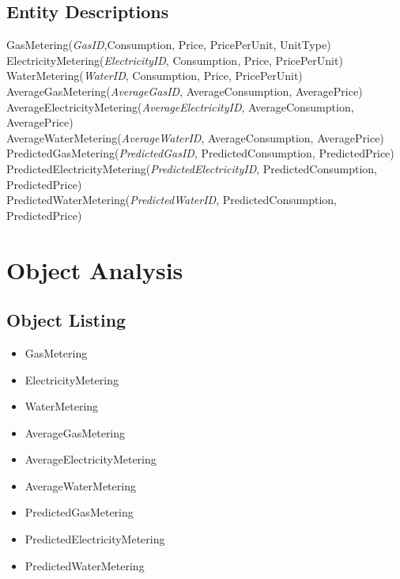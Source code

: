 \subsection{Entity Descriptions}
	GasMetering(\emph{GasID},Consumption, Price, PricePerUnit, UnitType)\\
	ElectricityMetering(\emph{ElectricityID}, Consumption, Price, PricePerUnit)\\
	WaterMetering(\emph{WaterID}, Consumption, Price, PricePerUnit)\\
	AverageGasMetering(\emph{AverageGasID}, AverageConsumption, AveragePrice)\\
	AverageElectricityMetering(\emph{AverageElectricityID}, AverageConsumption, AveragePrice)\\
	AverageWaterMetering(\emph{AverageWaterID}, AverageConsumption, AveragePrice)\\
	PredictedGasMetering(\emph{PredictedGasID}, PredictedConsumption, PredictedPrice)\\
	PredictedElectricityMetering(\emph{PredictedElectricityID}, PredictedConsumption, PredictedPrice)\\
	PredictedWaterMetering(\emph{PredictedWaterID}, PredictedConsumption, PredictedPrice)\\
\section{Object Analysis}

\subsection{Object Listing}
\begin{itemize}
	\item GasMetering
	\item ElectricityMetering
	\item WaterMetering
	\item AverageGasMetering
	\item AverageElectricityMetering
	\item AverageWaterMetering
	\item PredictedGasMetering
	\item PredictedElectricityMetering
	\item PredictedWaterMetering
\end{itemize}
